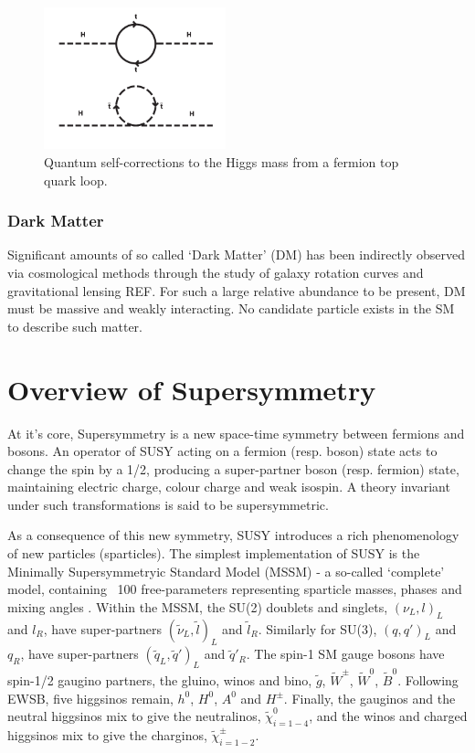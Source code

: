 \begin{figure}[ht!]
\centering
\includegraphics[width=0.47\textwidth,trim=0 250 0 0, clip=true]
{Figs/feynman/600px-Hqmc-vector.png}
\caption{Quantum self-corrections to the Higgs mass from a fermion top quark
loop.}
\label{fig:quantum_higgs_fermion_loop}
\end{figure}

\subsubsection{Dark Matter}
Significant amounts of so called `Dark Matter' (DM) has been indirectly observed
via cosmological methods through the study of galaxy rotation curves and
gravitational lensing REF. For such a large relative abundance to be present, DM
must be massive and weakly interacting. No candidate particle exists in the SM
to describe such matter.

\section{Overview of Supersymmetry}  %
\label{sec:theory_overview}
At it's core, Supersymmetry is a new space-time symmetry
between fermions and bosons. An operator of SUSY acting on a fermion 
(resp. boson) state acts to change the spin by a 1/2, producing a super-partner
boson (resp. fermion) state, maintaining electric charge, colour charge and weak
isospin. A theory invariant under such transformations is said to be
supersymmetric.

As a consequence of this new symmetry, SUSY introduces a rich phenomenology of
new particles (sparticles). The simplest implementation of SUSY is the
Minimally
Supersymmetryic Standard Model (MSSM) \cite{Martin:1997ns} - a so-called
`complete' model, containing
~100 free-parameters representing sparticle masses, phases and mixing angles 
\cite{Dimopoulos:1995ju}.
Within the MSSM, the SU(2) doublets and singlets, $(\nu_L, l)_L$ and $l_R$,
have super-partners $(\tilde{\nu}_L, \tilde{l})_L$ and $\tilde{l}_R$. Similarly
for SU(3), $(q, q')_L$ and $q_R$,
have super-partners $(\tilde{q}_L, \tilde{q}')_L$ and $\tilde{q}'_R$. The
spin-1 SM gauge bosons have spin-1/2 gaugino partners, the gluino, winos and
bino, $\tilde{g}$, $\tilde{W}^{\pm}$, $\tilde{W}^0$, $\tilde{B}^0$.
Following EWSB, five higgsinos remain, $h^0$, $H^0$, $A^0$ and
$H^{\pm}$. Finally, the gauginos and the neutral higgsinos mix to give the
neutralinos, $\tilde{\chi}^0_{i=1-4}$, and the winos and charged higgsinos mix
to give the charginos, $\tilde{\chi}^{\pm}_{i=1-2}$.

